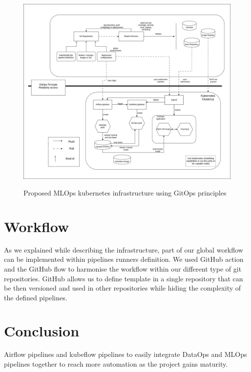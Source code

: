 \begin{figure}[!htbp]
    \centering
    \caption{Proposed MLOps kubernetes infrastructure using GitOps principles}
    \includegraphics[scale=0.35]{images/project/mthmlops-infra}
    \label{fig:project-infra}
\end{figure}


\section{Workflow}\label{sec:workflow}
As we explained while describing the infrastructure, part of our global workflow can be implemented within pipelines runners definition.
We used GitHub action and the GitHub flow to harmonise the workflow within our different type of git repositories.
GitHub allows us to define template in a single repository that can be then versioned and used in other repositories while hiding the complexity of the defined pipelines.



\section{Conclusion}\label{sec:conclusion}
Airflow pipelines and kubeflow pipelines to easily integrate DataOps and MLOps pipelines together to reach more automation as the project gains maturity.
